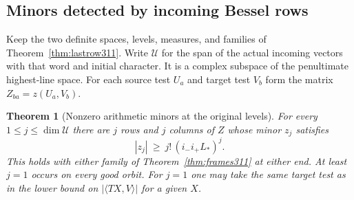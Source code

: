 \documentclass[a4paper,11pt]{article}
\newtheorem{theorem}[proposition]{Theorem}
\theoremstyle{definition}
\theoremstyle{remark}
\numberwithin{equation}{section}
\begin{document}
\subsection{Minors detected by incoming Bessel rows}\label{nav:VI-61}
Keep the two definite spaces, levels, measures, and families of
Theorem~\ref{thm:lastrow311}. Write \(\mathcal U\) for the
span of the actual incoming vectors with that word and initial
character. It is a complex subspace of the penultimate
highest-line space. For each source test \(U_a\) and target
test \(V_b\) form the matrix \(Z_{ba}=z(U_a,V_b)\).

\begin{theorem}[Nonzero arithmetic minors at the original levels]\leavevmode
\label{thm:minors311}
For every \(1\le j\le\dim\mathcal U\) there are \(j\) rows and
\(j\) columns of \(Z\) whose minor \(z_j\) satisfies
\[
                  |z_j|\ \ge\ j!\,(i_-i_+ L_*)^j .
\]
This holds with either family of Theorem~\ref{thm:frames311}
at either end. At least \(j=1\) occurs on every good orbit.
For \(j=1\) one may take the same target test as in the
lower bound on \(|\langle TX,V\rangle|\) for a given \(X\).
\end{theorem}
\end{document}
